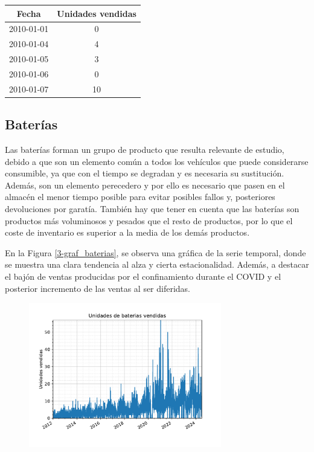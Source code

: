 \begin{table}[H]
	{\begin{tabular}{|c|c|}
		\hline
        \textbf{Fecha} & \textbf{Unidades vendidas} \\
        \hline
        2010-01-01 & 0 \\
        \hline
        2010-01-04 & 4 \\
        \hline
        2010-01-05 & 3 \\
        \hline
        2010-01-06 & 0 \\
        \hline
        2010-01-07 & 10 \\
        \hline
	\end{tabular}}
\end{table}


\subsection{Baterías}

Las baterías forman un grupo de producto que resulta relevante de estudio, debido a que son un elemento común a todos los vehículos que puede considerarse consumible, ya que con el tiempo se degradan y es necesaria su sustitución. Además, son un elemento perecedero y por ello es necesario que pasen en el almacén el menor tiempo posible para evitar posibles fallos y, posteriores devoluciones por garatía. También hay que tener en cuenta que las baterías son productos más voluminosos y pesados que el resto de productos, por lo que el coste de inventario es superior a la media de los demás productos.

En la Figura \ref*{3-graf_baterias}, se observa una gráfica de la serie temporal, donde se muestra una clara tendencia al alza y cierta estacionalidad. Además, a destacar el bajón de ventas producidas por el confinamiento durante el COVID y el posterior incremento de las ventas al ser diferidas.

\begin{figure}[H]
	{\includegraphics[width=0.75\textwidth]{imagenes/grafica_baterias.pdf}}
\end{figure}

